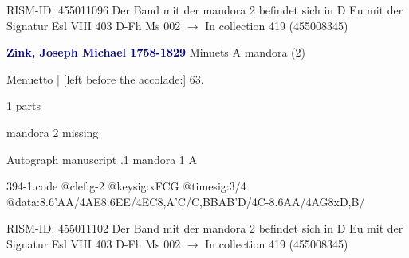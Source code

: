 \documentclass[twocolumn]{book}
\begin{document}
\newline RISM-ID: 455011096
\newline Der Band mit der mandora 2 befindet sich in D Eu mit der Signatur Esl VIII 403
\newline D-Fh  Ms 002
\newline $\rightarrow$ In collection 419 (455008345)

\newline \par \vspace{7pt} \textcolor{darkblue}{\textbf{Zink, Joseph Michael  1758-1829}}
\newline Minuets  A  
\newline mandora (2)
\newline \begin{itshape}[f.33r, at left:] Menuetto | [left before the accolade:] 63.\end{itshape} 
\newline \textcolor{darkblue}{}  1 parts  
\newline \begin{small} mandora 2 missing\end{small} 
\newline Autograph manuscript
.1  mandora 1  A  
\begin{filecontents*}{394-1.code}
@clef:g-2
@keysig:xFCG
@timesig:3/4
@data:{8.6'AA}/4AE{8.6EE}/4EC{8,A'C}/C,BBA{B'D}/4C-{8.6AA}/4AG{8xD,B}/
\end{filecontents*}
\newline
%

\newline RISM-ID: 455011102
\newline Der Band mit der mandora 2 befindet sich in D Eu mit der Signatur Esl VIII 403
\newline D-Fh  Ms 002
\newline $\rightarrow$ In collection 419 (455008345)
\end{document}

